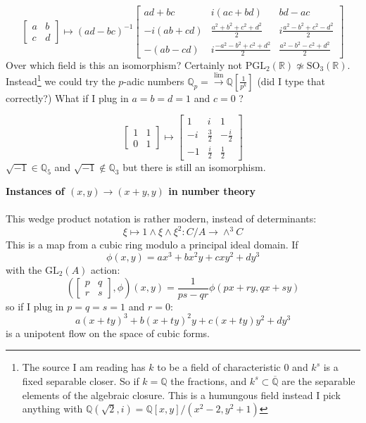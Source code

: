 \documentclass[12pt]{article}
\begin{document}
$$ \left[\begin{array}{cc}
a & b \\ c & d \end{array} \right] \mapsto (ad-bc)^{-1}
\left[ \begin{array}{ccc} 
ad + bc & i(ac+bd) & bd-ac \\
-i(ab+cd) & \frac{a^2 + b^2 + c^2 + d^2}{2}
& i \frac{a^2 - b^2 + c^2 - d^2}{2} \\ 
-(ab-cd) & i \frac{-a^2 - b^2 + c^2 + d^2}{2} & 
\frac{a^2 - b^2 - c^2 + d^2}{2} \end{array}\right]$$
Over which field is this an isomorphism?  Certainly not $\text{PGL}_2(\mathbb{R}) \not \simeq \text{SO}_3(\mathbb{R}).$  Instead\footnote{The source I am reading has $k$ to be a field of characteristic $0$ and $k^s$ is a fixed separable closer.  So if $k = \mathbb{Q}$ the fractions, and $k^s \subset \overline{\mathbb{Q}}$ are the separable elements of the algebraic closure.  This is a humungous field instead I pick anything with $\mathbb{Q}(\sqrt{2}, i) = \mathbb{Q}[x,y]/(x^2 - 2, y^2 + 1)$} we could try the $p$-adic numbers $ \mathbb{Q}_p = \stackrel{\lim}{\to} \mathbb{Q}[\frac{1}{p^k}] $ (did I type that correctly?) What if I plug in $a = b = d = 1$ and $c = 0$ ?

$$ \left[\begin{array}{cc}
1 & 1 \\ 0 & 1 \end{array} \right] \mapsto 
\left[ \begin{array}{rrr} 
1 & i & 1 \\
-i & \frac{3}{2}
&  -\frac{i}{2} \\ 
-1 &  \frac{i}{2} & 
\frac{1}{2} \end{array}\right]$$
$\sqrt{-1} \in \mathbb{Q}_5$ and $\sqrt{-1}\notin \mathbb{Q}_3$ but there is still an isomorphism.
\newpage


\noindent \textbf{Instances of $(x,y) \to (x+y,y)$ in number theory} \\ \\
This wedge product notation is rather modern, instead of determinants:
$$ \xi \mapsto 1 \wedge \xi \wedge \xi^2 : C / A \to \wedge^3 C $$
This is a map from a cubic ring modulo a principal ideal domain.  If 
$$ \phi(x,y) = ax^3 + bx^2 y + c xy^2 + dy^3$$
with the $\text{GL}_2(A)$ action:
$$ \left(\left[ 
\begin{array}{cc} p & q \\ r & s\end{array}
\right], \phi \right)(x,y) = \frac{1}{ps-qr}\phi(px + ry, qx + sy) $$
so if I plug in $p=q=s=1$ and $r = 0$:
$$ a(x+ty)^3 + b(x+ty)^2 y + c(x+ty)y^2 + dy^3 $$
is a unipotent flow on the space of cubic forms.
\newpage
\end{document}
